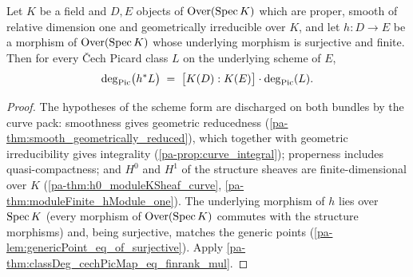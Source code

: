 \begin{theorem}
  \label{pa-thm:classDeg_cechPicMap_of_isFinite}
  \leanok

  Let \(K\) be a field and \(D, E\) objects of \(\mathrm{Over}(\operatorname{Spec} K)\) which are proper,
  smooth of relative dimension one and geometrically irreducible over \(K\), and let
  \(h : D \to E\) be a morphism of \(\mathrm{Over}(\operatorname{Spec} K)\) whose underlying morphism is
  surjective and finite. Then for every \v Cech Picard class \(L\) on the underlying
  scheme of \(E\),
  \[
    \deg_{\operatorname{Pic}}\bigl(h^{*}L\bigr)
      \;=\; \bigl[K(D) : K(E)\bigr] \cdot \deg_{\operatorname{Pic}}(L).
  \]
\end{theorem}
\begin{proof}
  \leanok
  The hypotheses of the scheme form are discharged on both bundles by the curve pack:
  smoothness gives geometric reducedness (\ref{pa-thm:smooth_geometrically_reduced}),
  which together with geometric irreducibility gives integrality
  (\ref{pa-prop:curve_integral}); properness includes quasi-compactness; and \(H^0\) and
  \(H^1\) of the structure sheaves are finite-dimensional over \(K\)
  (\ref{pa-thm:h0_moduleKSheaf_curve}, \ref{pa-thm:moduleFinite_hModule_one}). The
  underlying morphism of \(h\) lies over \(\operatorname{Spec} K\) (every morphism of
  \(\mathrm{Over}(\operatorname{Spec} K)\) commutes with the structure morphisms) and, being surjective,
  matches the generic points (\ref{pa-lem:genericPoint_eq_of_surjective}). Apply
  \ref{pa-thm:classDeg_cechPicMap_eq_finrank_mul}.
\end{proof}

